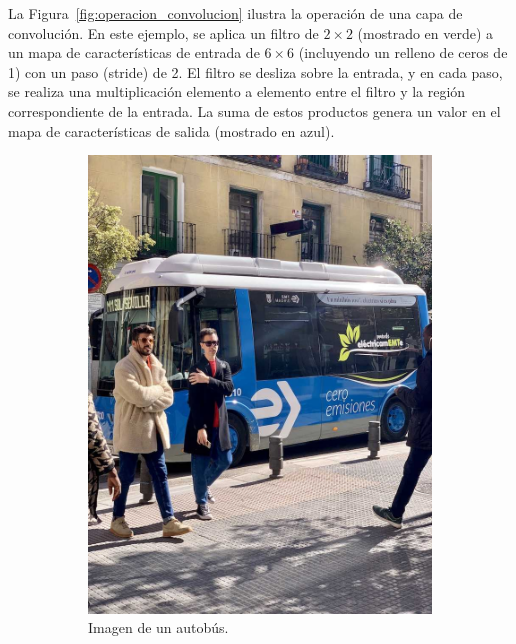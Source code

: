 \documentclass[11pt,spanish,listoffigures,listoftables]{tfgetsinf}
\begin{document}
La Figura~\ref{fig:operacion_convolucion} ilustra la operación de una capa de convolución. En este ejemplo, se aplica un filtro de $2 \times 2$ (mostrado en verde) a un mapa de características de entrada de $6 \times 6$ (incluyendo un relleno de ceros de 1) con un paso (stride) de 2. El filtro se desliza sobre la entrada, y en cada paso, se realiza una multiplicación elemento a elemento entre el filtro y la región correspondiente de la entrada. La suma de estos productos genera un valor en el mapa de características de salida (mostrado en azul).

\begin{figure}[H]
   \centering
   \begin{subfigure}[b]{0.25\textwidth}
      \centering
      \includegraphics[width=\textwidth]{images/estado_del_arte/bus_original.jpg}
      \caption[Imagen de un autobús]{Imagen de un autobús.}
      \label{fig:bus_original}
   \end{subfigure}
   \hfill
   \begin{subfigure}[b]{0.7\textwidth}

\end{subfigure}
\end{figure}
\end{document}
